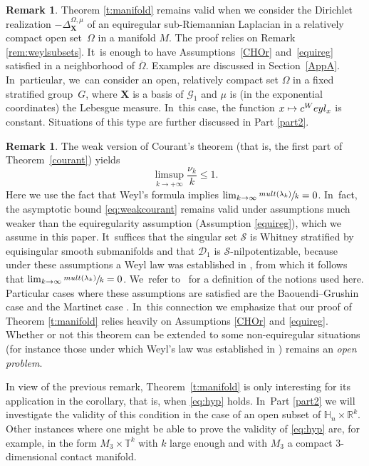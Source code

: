 \documentclass[11pt]{article}
\newcommand\mto{\mathchoice{\longmapsto}{\mapsto}{\mapsto}{\mapsto}}
\let\oldsfrac\sfrac
\renewcommand{\sfrac}[2]{{\oldsfrac{#1}{#2}}}
\newcommand{\mult}{\textup{mult}}
\newcommand{\Weyl}{\textup{Weyl}}
\newcommand{\bX}{{\boldsymbol{X}}}
\theoremstyle{definition}
\newtheorem{remark}[theorem]{Remark}
\let\Xb\bX
\newcommand{\1}{\mathbbm{1}}
\newcommand{\R}{\mathbb{R}}
\numberwithin{equation}{section}
\begin{document}
\begin{remark} \label{remdom}
Theorem \ref{t:manifold} remains valid when we consider the Dirichlet realization $-\Delta^{\Omega,\mu}_\Xb$ of an equiregular sub-Riemannian Laplacian in a relatively compact open set~$\Omega$ in a manifold $M$. The proof relies on Remark \ref{rem:weylsubsets}. It~is enough to have Assumptions~\ref{CHOr} and~\ref{equireg} satisfied in a neighborhood of $\overline{\Omega}$.
Examples are discussed in Section~\ref{AppA}. In~particular, we~can consider an open, relatively compact set $\Omega$ in a fixed stratified group~$G$, where $\Xb$ is a basis of $\mathcal G_1$
and $\mu$ is (in the exponential coordinates) the Lebesgue measure. In~this case, the function $x\mto c^\Weyl_x$ is constant. Situations of this type are further discussed in Part \ref{part2}.
\end{remark}

\begin{remark}\label{remcourantasymp}
The weak version of Courant's theorem (that is, the first part of Theorem~\ref{courant}) yields
\begin{equation}\label{eq:weakcourant}
\limsup_{k\to+\infty} \frac{\nu_k}k \leq 1.
\end{equation}
Here we use the fact that Weyl's formula implies $\lim_{k\to\infty} \sfrac{\mult(\lambda_k)}{k}=0$. In~fact, the asymptotic bound \eqref{eq:weakcourant} remains valid under assumptions much weaker than the equiregularity assumption (Assumption \ref{equireg}), which we assume in this paper. It~suffices that the singular set $\mathcal S$ is Whitney stratified by equisingular smooth submanifolds and that $\mathcal D_1$ is $\mathcal S$-nilpotentizable, because under these assumptions a Weyl law was established in \cite{CHT1}, from which it follows that $\lim_{k\to\infty} \sfrac{\mult(\lambda_k)}{k}=0$. We~refer to~\cite{CHT1} for a definition of the notions used here. Particular cases where these assumptions are satisfied are the Baouendi--Grushin case \cite[Th.\,7.2]{CHT1} and the Martinet case \cite[Th.\,7.3]{CHT1}. In~this connection we emphasize that our proof of Theorem \ref{t:manifold} relies heavily on Assumptions \ref{CHOr} and \ref{equireg}. Whether or not this theorem can be extended to some non-equiregular situations (for instance those under which Weyl's law was established in \cite{CHT1}) remains an \emph{open problem}.
\end{remark}

In view of the previous remark, Theorem~\ref{t:manifold} is only interesting for its application in the corollary, that is, when \eqref{eq:hyp} holds. In~Part \ref{part2} we will investigate the validity of this condition in the case of an open subset of $\mathbb H_n\times\R^k$. Other instances where one might be able to prove the validity of \eqref{eq:hyp} are, for example, in the form $M_3\times \mathbb T^k$ with $k$ large enough and with $M_3$ a compact $3$-dimensional contact manifold.
\end{document}
